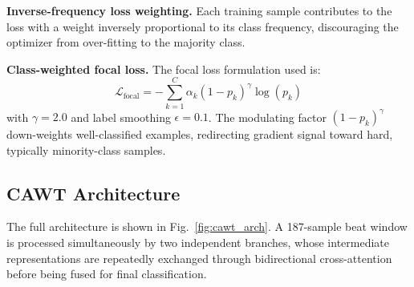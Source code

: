 \documentclass[conference]{IEEEtran}
\begin{document}
\textbf{Inverse-frequency loss weighting.} Each training sample contributes to the loss with a weight inversely proportional to its class frequency, discouraging the optimizer from over-fitting to the majority class.
 
\textbf{Class-weighted focal loss.} The focal loss formulation used is:
\begin{equation}
    \mathcal{L}_{\text{focal}} = - \sum_{k=1}^{C} \alpha_k (1 - p_k)^{\gamma} \log(p_k)
\end{equation}
with $\gamma = 2.0$ and label smoothing $\epsilon = 0.1$. The modulating factor $(1-p_k)^\gamma$ down-weights well-classified examples, redirecting gradient signal toward hard, typically minority-class samples.
 
\subsection{CAWT Architecture}
The full architecture is shown in Fig.~\ref{fig:cawt_arch}. A 187-sample beat window is processed simultaneously by two independent branches, whose intermediate representations are repeatedly exchanged through bidirectional cross-attention before being fused for final classification.
 
\end{document}
